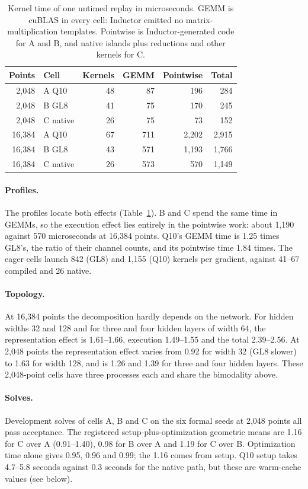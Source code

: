 \documentclass[11pt]{article}
\begin{document}
\begin{table}[htbp]\centering\small
\setlength{\tabcolsep}{4pt}
\caption{Kernel time of one untimed replay in microseconds. GEMM is cuBLAS in every cell: Inductor emitted no matrix-multiplication templates. Pointwise is Inductor-generated code for A and B, and native islands plus reductions and other kernels for C.}
\label{tab:ablationprofile}
\begin{tabular}{rlrrrr}\toprule
Points & Cell & Kernels & GEMM & Pointwise & Total\\\midrule
2,048 & A Q10 & 48 & 87 & 196 & 284\\
2,048 & B GL8 & 41 & 75 & 170 & 245\\
2,048 & C native & 26 & 75 & 73 & 152\\
16,384 & A Q10 & 67 & 711 & 2,202 & 2,915\\
16,384 & B GL8 & 43 & 571 & 1,193 & 1,766\\
16,384 & C native & 26 & 573 & 570 & 1,149
\\\bottomrule\end{tabular}
\end{table}

\paragraph{Profiles.}
The profiles locate both effects (Table~\ref{tab:ablationprofile}). B and C
spend the same time in GEMMs, so the execution effect lies entirely in the
pointwise work: about 1,190 against 570 microseconds at 16,384 points. Q10's
GEMM time is 1.25 times GL8's, the ratio of their channel counts, and its
pointwise time 1.84 times. The eager cells launch 842 (GL8) and 1,155 (Q10)
kernels per gradient, against 41--67 compiled and 26 native.

\paragraph{Topology.}
At 16,384 points the decomposition hardly depends on the network. For hidden
widths 32 and 128 and for three and four hidden layers of width 64, the
representation effect is 1.61--1.66, execution 1.49--1.55 and the total
2.39--2.56. At 2,048 points the representation effect varies from 0.92 for
width 32 (GL8 slower) to 1.63 for width 128, and is 1.26 and 1.39 for
three and four hidden layers. These 2,048-point cells have three processes
each and share the bimodality above.

\paragraph{Solves.}
Development solves of cells A, B and C on the six formal seeds at 2,048
points all pass acceptance. The registered setup-plus-optimization geometric
means are 1.16 for C over A (0.91--1.40), 0.98 for B over A and 1.19 for C
over B. Optimization time alone gives 0.95, 0.96 and 0.99; the 1.16 comes
from setup. Q10 setup takes 4.7--5.8 seconds against 0.3 seconds for the
native path, but these are warm-cache values (see below).
\end{document}
